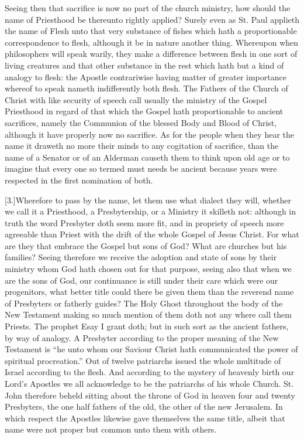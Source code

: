 Seeing then that sacrifice is now no part of the church ministry, how should the name of Priesthood be thereunto rightly applied? Surely even as St. Paul applieth the name of Flesh unto that very substance of fishes which hath a proportionable correspondence to flesh, although it be in nature another thing. Whereupon when philosophers will speak warily, they make a difference between flesh in one sort of living creatures and that other substance in the rest which hath but a kind of analogy to flesh: the Apostle contrariwise having matter of greater importance whereof to speak nameth indifferently both flesh. The Fathers of the Church of Christ with like security of speech call usually the ministry of the Gospel Priesthood in regard of that which the Gospel hath  proportionable to ancient sacrifices,
 namely the Communion of the blessed Body and Blood of Christ, although it have properly now no sacrifice. As for the people when they hear the name it draweth no more their minds to any cogitation of sacrifice, than the name of a Senator or of an Alderman causeth them to think upon old age or to imagine that every one so termed must needs be ancient because years were respected in the first nomination of both.

[3.]Wherefore to pass by the name, let them use what dialect they will, whether we call it a Priesthood, a Presbytership, or a Ministry it skilleth not: although in truth the word Presbyter doth seem more fit, and in propriety of speech more agreeable than Priest with the drift of the whole Gospel of Jesus Christ. For what are they that embrace the Gospel but sons of God? What are churches but his families? Seeing therefore we receive the adoption and state of sons by their ministry whom God hath chosen out for that purpose, seeing also that when we are the sons of God, our continuance is still under their care which were our progenitors, what better title could there be given them than the reverend name of Presbyters or fatherly guides? The Holy Ghost throughout the body of the New Testament making so much mention of them doth not any where call them Priests. The prophet Esay I grant doth; but in such sort as the ancient fathers, by way of analogy. A Presbyter according to the proper meaning of the New Testament is “he unto whom our Saviour Christ hath communicated the power of spiritual procreation.” Out of twelve patriarchs issued the whole multitude  of Israel according to the flesh.
 And according to the mystery of heavenly birth our Lord’s Apostles we all acknowledge to be the patriarchs of his whole Church. St. John therefore beheld sitting about the throne of God in heaven four and twenty Presbyters, the one half fathers of the old, the other of the new Jerusalem. In which respect the Apostles likewise gave themselves the same title, albeit that name were not proper but common unto them with others.

